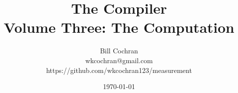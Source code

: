 \documentclass[12pt,oneside]{book}
\begin{document}
\title{The Compiler\\[0.4em]\large Volume Three: The Computation}
\author{Bill Cochran\\wkcochran@gmail.com\\https://github.com/wkcochran123/measurement}
\date{\today}
\maketitle

\frontmatter
\onehalfspacing
\tableofcontents



\mainmatter

















\backmatter
\printbibliography
\end{document}
